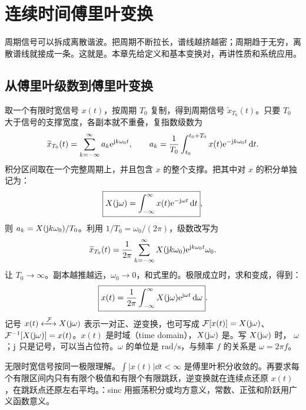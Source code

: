 \chapter{连续时间傅里叶变换}
\label{chap:ctft}

周期信号可以拆成离散谐波。把周期不断拉长，谱线越挤越密；周期趋于无穷，离散谱线就接成一条。这就是。本章先给定义和基本变换对，再讲性质和系统应用。

\section{从傅里叶级数到傅里叶变换}
\label{sec:ctft-definition}

取一个有限时宽信号 $x(t)$，按周期 $T_0$ 复制，得到周期信号 $\widetilde x_{T_0}(t)$。只要 $T_0$ 大于信号的支撑宽度，各副本就不重叠，复指数级数为
\begin{equation}
  \widetilde x_{T_0}(t)=\sum_{k=-\infty}^{\infty}a_k\mathrm{e}^{\mathrm{j} k\omega_0t},\qquad
  a_k=\frac{1}{T_0}\int_{t_0}^{t_0+T_0}x(t)\mathrm{e}^{-\mathrm{j} k\omega_0t}\mathop{}\!\mathrm{d} t.
  \label{eq:ctft-periodic-series-start}
\end{equation}
积分区间取在一个完整周期上，并且包含 $x$ 的整个支撑。把其中对 $x$ 的积分单独记为：
\begin{equation}
  \boxed{X(\mathrm{j}\omega)=\int_{-\infty}^{\infty}x(t)\mathrm{e}^{-\mathrm{j}\omega t}\mathop{}\!\mathrm{d} t},
  \label{eq:ctft-definition}
\end{equation}
则 $a_k=X(\mathrm{j} k\omega_0)/T_0$。利用 $1/T_0=\omega_0/(2\pi)$，级数改写为
\[
  \widetilde x_{T_0}(t)
  =\frac{1}{2\pi}\sum_{k=-\infty}^{\infty}
    X(\mathrm{j} k\omega_0)\mathrm{e}^{\mathrm{j} k\omega_0t}\omega_0.
\]
让 $T_0\to\infty$。副本越推越远，$\omega_0\to0$，和式里的。极限成立时，求和变成，得到：
\begin{equation}
  \boxed{x(t)=\frac{1}{2\pi}\int_{-\infty}^{\infty}X(\mathrm{j}\omega)\mathrm{e}^{\mathrm{j}\omega t}\mathop{}\!\mathrm{d}\omega}.
  \label{eq:ctft-inverse}
\end{equation}
记号 $x(t)\xleftrightarrow{\ \mathcal F\ }X(\iu\omega)$ 表示一对正、逆变换，也可写成 $\mathcal F[x(t)]=X(\mathrm{j}\omega)$、$\mathcal F^{-1}[X(\mathrm{j}\omega)]=x(t)$。$x(t)$ 是时域（time domain），$X(\mathrm{j}\omega)$ 是。写 $X(\mathrm{j}\omega)$ 时， $\omega$；$\mathrm{j}$ 只是记号，可以当占位符。$\omega$ 的单位是 $\mathrm{rad/s}$，与频率 $f$ 的关系是 $\omega=2\pi f$。

无限时宽信号按同一极限理解。$\int |x(t)|\dd t<\infty$ 是傅里叶积分收敛的。再要求每个有限区间内只有有限个极值和有限个有限跳跃，逆变换就在连续点还原 $x(t)$，在跳跃点还原左右平均。：sinc 用振荡积分或均方意义，常数、正弦和阶跃用广义函数意义。

